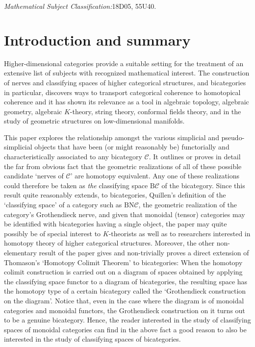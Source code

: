 \documentclass[]{amsart}
\begin{document}
\emph{Mathematical Subject Classification:}18D05, 55U40.

\section{Introduction and summary}
Higher-dimensional categories provide a suitable setting for the treatment of an extensive list of
subjects with recognized mathematical interest. The construction of nerves and classifying spaces
of higher categorical structures, and bicategories in particular, discovers ways to transport
categorical coherence to homotopical coherence  and it has shown its relevance as a tool in
algebraic topology, algebraic geometry, algebraic $K$-theory, string theory,  conformal fields
theory, and in the study of geometric structures on low-dimensional manifolds.

This paper explores the relationship amongst the various simplicial and pseudo-simplicial objects
that have been (or might reasonably be) functorially and characteristically associated to any
bicategory ${\ensuremath{\mathcal{C}}}$. It outlines or proves in detail the far from obvious fact that the geometric
realizations of all of these possible candidate `nerves of ${\ensuremath{\mathcal{C}}}$' are homotopy equivalent. Any one
of these realizations could therefore be taken as {\em the} classifying space ${\ensuremath{\mathrm{B}}}{\ensuremath{\mathcal{C}}}$ of the
bicategory. Since this result quite reasonably extends, to bicategories,  Quillen's definition
\cite{quillen} of the `classifying space' of a category such as ${\ensuremath{\mathrm{B}}}{\ensuremath{\mathrm{N}}}{\ensuremath{\mathcal{C}}}$, the geometric
realization of the category's Grothendieck nerve, and given that monoidal (tensor) categories may
be identified with bicategories having a single object, the paper may quite possibly be of special
interest to $K$-theorists as well as to researchers interested in homotopy theory of higher
categorical structures. Moreover, the other non-elementary result of the paper gives and
non-trivially proves a direct extension of Thomason's `Homotopy Colimit Theorem' \cite{thomason} to
bicategories: When the homotopy colimit construction is carried out on a diagram of spaces obtained
by applying the classifying space functor to a diagram of bicategories, the resulting space has the
homotopy type of a certain bicategory called the `Grothendieck construction on the diagram'.
Notice that, even in the case where the diagram is of monoidal categories and monoidal functors,
the Grothendieck construction on it turns out to be a genuine bicategory. Hence, the reader
interested in the study of classifying spaces of monoidal categories can find in the above fact a
good reason to also be interested in the study of classifying spaces of bicategories.
\end{document}

